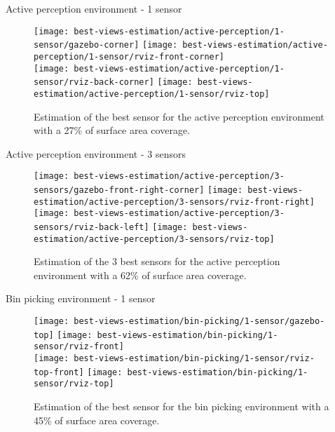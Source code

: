 \begin{frame}{Active perception environment - 1 sensor}
	\begin{figure}
		\centering
		\texttt{[image: best-views-estimation/active-perception/1-sensor/gazebo-corner]}\hspace{4em}
		\texttt{[image: best-views-estimation/active-perception/1-sensor/rviz-front-corner]}\\
		\texttt{[image: best-views-estimation/active-perception/1-sensor/rviz-back-corner]}\hspace{2em}
		\texttt{[image: best-views-estimation/active-perception/1-sensor/rviz-top]}
		\caption{Estimation of the best sensor for the active perception environment with a 27\% of surface area coverage.}
	\end{figure}
\end{frame}


\begin{frame}{Active perception environment - 3 sensors}
	\begin{figure}
		\centering
		\texttt{[image: best-views-estimation/active-perception/3-sensors/gazebo-front-right-corner]}\hspace{4em}
		\texttt{[image: best-views-estimation/active-perception/3-sensors/rviz-front-right]}\\
		\texttt{[image: best-views-estimation/active-perception/3-sensors/rviz-back-left]}\hspace{2em}
		\texttt{[image: best-views-estimation/active-perception/3-sensors/rviz-top]}
		\caption{Estimation of the 3 best sensors for the active perception environment with a 62\% of surface area coverage.}
	\end{figure}
\end{frame}


\begin{frame}{Bin picking environment - 1 sensor}
	\begin{figure}
		\centering
		\texttt{[image: best-views-estimation/bin-picking/1-sensor/gazebo-top]}\hspace{2em}
		\texttt{[image: best-views-estimation/bin-picking/1-sensor/rviz-front]}\\\vspace{0.5em}
		\texttt{[image: best-views-estimation/bin-picking/1-sensor/rviz-top-front]}\hspace{3em}
		\texttt{[image: best-views-estimation/bin-picking/1-sensor/rviz-top]}
		\caption{Estimation of the best sensor for the bin picking environment with a 45\% of surface area coverage.}
	\end{figure}
\end{frame}


